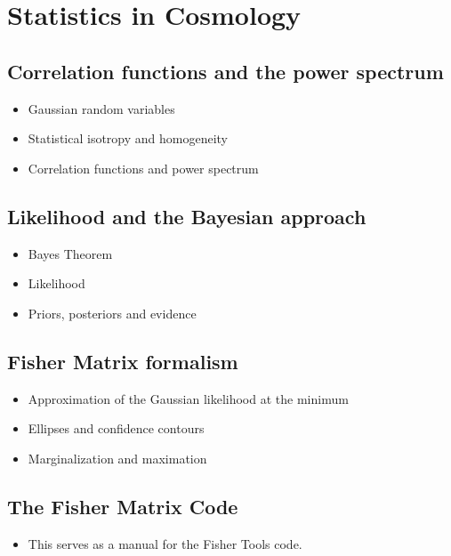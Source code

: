 \chapter{Statistics in Cosmology} %

\label{Statis} %


\section{Correlation functions and the power spectrum}
\begin{itemize}
\item Gaussian random variables
\item Statistical isotropy and homogeneity
\item Correlation functions and power spectrum
\end{itemize}

\section{Likelihood and the Bayesian approach}
\begin{itemize}
\item Bayes Theorem 
\item Likelihood
\item Priors, posteriors and evidence
\end{itemize}

\section{Fisher Matrix formalism}
\begin{itemize}
\item Approximation of the Gaussian likelihood at the minimum
\item Ellipses and confidence contours
\item Marginalization and maximation
\end{itemize}

\section{The Fisher Matrix Code}
\begin{itemize}
\item This serves as a manual for the Fisher Tools code.
\end{itemize}

